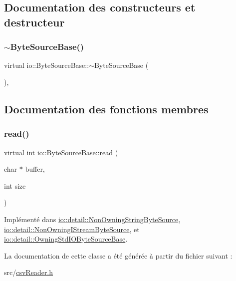 \subsection{Documentation des constructeurs et destructeur}
\mbox{\label{classio_1_1ByteSourceBase_ac3228fe608b3268e49c2243d668d6efd}} 
\subsubsection{\texorpdfstring{$\sim$\+Byte\+Source\+Base()}{~ByteSourceBase()}}
{\footnotesize\ttfamily virtual io\+::\+Byte\+Source\+Base\+::$\sim$\+Byte\+Source\+Base (\begin{DoxyParamCaption}{ }\end{DoxyParamCaption})\hspace{0.3cm}{\ttfamily [inline]}, {\ttfamily [virtual]}}



\subsection{Documentation des fonctions membres}
\mbox{\label{classio_1_1ByteSourceBase_a9598bcc869b79e44da07f0e6fa478615}} 
\subsubsection{\texorpdfstring{read()}{read()}}
{\footnotesize\ttfamily virtual int io\+::\+Byte\+Source\+Base\+::read (\begin{DoxyParamCaption}\item[{char $\ast$}]{buffer,  }\item[{int}]{size }\end{DoxyParamCaption})\hspace{0.3cm}{\ttfamily [pure virtual]}}



Implémenté dans \hyperlink{classio_1_1detail_1_1NonOwningStringByteSource_aba194be7e3a141f40d683db483a620bb}{io\+::detail\+::\+Non\+Owning\+String\+Byte\+Source}, \hyperlink{classio_1_1detail_1_1NonOwningIStreamByteSource_ac7b1968c8314896d7ec0ebb97fdda30d}{io\+::detail\+::\+Non\+Owning\+I\+Stream\+Byte\+Source}, et \hyperlink{classio_1_1detail_1_1OwningStdIOByteSourceBase_a9269e7bfd07ebf2fa3518912fe7bebd0}{io\+::detail\+::\+Owning\+Std\+I\+O\+Byte\+Source\+Base}.



La documentation de cette classe a été générée à partir du fichier suivant \+:\begin{DoxyCompactItemize}
\item 
src/\hyperlink{csvReader_8h}{csv\+Reader.\+h}\end{DoxyCompactItemize}
